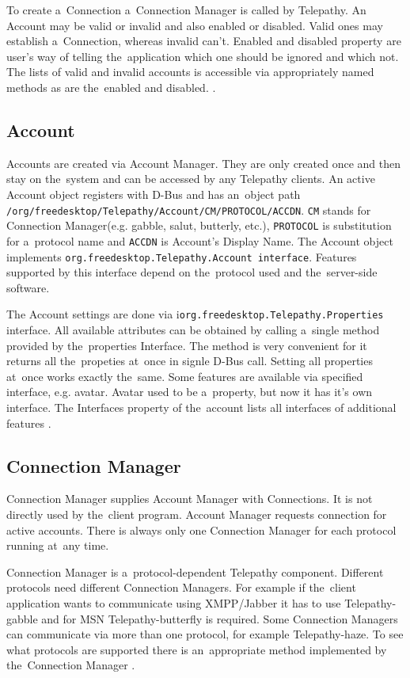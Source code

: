 To create a~Connection a~Connection Manager is called by Telepathy. An Account may be valid or invalid and also enabled or disabled. Valid ones may establish a~Connection, whereas invalid can't. Enabled and disabled property are user's way of telling the~application which one should be ignored and which not. The lists of valid and invalid accounts is accessible via appropriately named methods as are the~enabled and disabled.  \cite{TPWiki}.

\subsection*{Account}
Accounts are created via Account Manager. They are only created once and then stay on the~system and can be accessed by any Telepathy clients. An active Account object registers with D-Bus and has an~object path \verb|/org/freedesktop/Telepathy/Account/CM/PROTOCOL/ACCDN|. \verb|CM| stands for Connection Manager(e.g. gabble, salut, butterly, etc.), \verb|PROTOCOL| is substitution for a~protocol name and \verb|ACCDN| is Account's Display Name. The Account object implements \verb|org.freedesktop.Telepathy.Account interface|. Features supported by this interface depend on the~protocol used and the~server-side software. 

The Account settings are done via i\verb|org.freedesktop.Telepathy.Properties| interface. All available attributes can be obtained by calling a~single method provided by the~properties Interface. The method is very convenient for it returns all the~propeties at~once in signle D-Bus call. Setting all properties at~once works exactly the~same. Some features are available via specified interface, e.g. avatar. Avatar used to be a~property, but now it has it's own interface. The Interfaces property of the~account lists all interfaces of additional features \cite{TPWiki}.

\subsection*{Connection Manager}
Connection Manager supplies Account Manager with Connections. It is not directly used by the~client program. Account Manager requests connection for active accounts. There is always only one Connection Manager for each protocol running at~any time.

Connection Manager is a~protocol-dependent Telepathy component. Different protocols need different Connection Managers. For example if the~client application wants to communicate using XMPP/Jabber it has to use Telepathy-gabble and for MSN Telepathy-butterfly is required. Some Connection Managers can communicate via more than one protocol, for example Telepathy-haze. To see what protocols are supported there is an~appropriate method implemented by the~Connection Manager \cite{TPWiki}.

